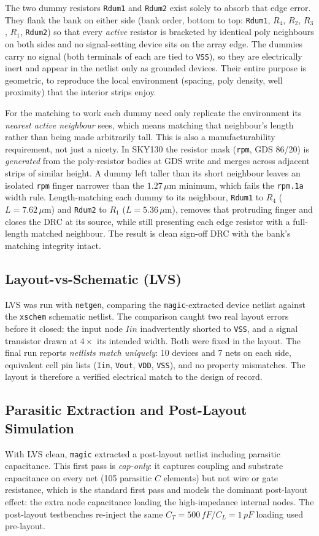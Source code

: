 \documentclass{article}
\begin{document}
The two dummy resistors \texttt{Rdum1} and \texttt{Rdum2} exist solely to absorb that edge error.
They flank the bank on either side (bank order, bottom to top:
\texttt{Rdum1}, $R_4$, $R_2$, $R_3$, $R_1$, \texttt{Rdum2}) so that every \emph{active} resistor is
bracketed by identical poly neighbours on both sides and no signal-setting device sits on the
array edge. The dummies carry no signal (both terminals of each are tied to \texttt{VSS}), so
they are electrically inert and appear in the netlist only as grounded devices. Their entire
purpose is geometric, to reproduce the local environment (spacing, poly density, well proximity)
that the interior strips enjoy.

For the matching to work each dummy need only replicate the environment its \emph{nearest active
neighbour} sees, which means matching that neighbour's length rather than being made arbitrarily
tall. This is also a manufacturability requirement, not just a nicety. In SKY130 the resistor
mask (\texttt{rpm}, GDS 86/20) is \emph{generated} from the poly-resistor bodies at GDS write and
merges across adjacent strips of similar height. A dummy left taller than its short neighbour
leaves an isolated \texttt{rpm} finger narrower than the $1.27\,\mu$m minimum, which fails the
\texttt{rpm.1a} width rule. Length-matching each dummy to its neighbour, \texttt{Rdum1} to
$R_4$ ($L=7.62\,\mu$m) and \texttt{Rdum2} to $R_1$ ($L=5.36\,\mu$m), removes that protruding
finger and closes the DRC at its source, while still presenting each edge resistor with a
full-length matched neighbour. The result is clean sign-off DRC with the bank's matching
integrity intact.

\subsection{Layout-vs-Schematic (LVS)}
\label{sec:lvs}
LVS was run with \texttt{netgen}, comparing the \texttt{magic}-extracted device netlist against
the \texttt{xschem} schematic netlist. The comparison caught two real layout errors before it
closed: the input node $Iin$ inadvertently shorted to \texttt{VSS}, and a signal transistor
drawn at $4\times$ its intended width. Both were fixed in the layout. The final run
reports \emph{netlists match uniquely}: 10 devices and 7 nets on each side, equivalent cell pin
lists (\texttt{Iin}, \texttt{Vout}, \texttt{VDD}, \texttt{VSS}), and no property mismatches. The
layout is therefore a verified electrical match to the design of record.

\subsection{Parasitic Extraction and Post-Layout Simulation}
\label{sec:pex}
With LVS clean, \texttt{magic} extracted a post-layout netlist including parasitic capacitance.
This first pass is \emph{cap-only}: it captures coupling and substrate capacitance on every net
(105 parasitic $C$ elements) but not wire or gate resistance, which is the standard first pass
and models the dominant post-layout effect: the extra node capacitance loading the
high-impedance internal nodes. The post-layout testbenches re-inject the same
$C_T=500\,fF$/$C_L=1\,pF$ loading used pre-layout.
\end{document}
